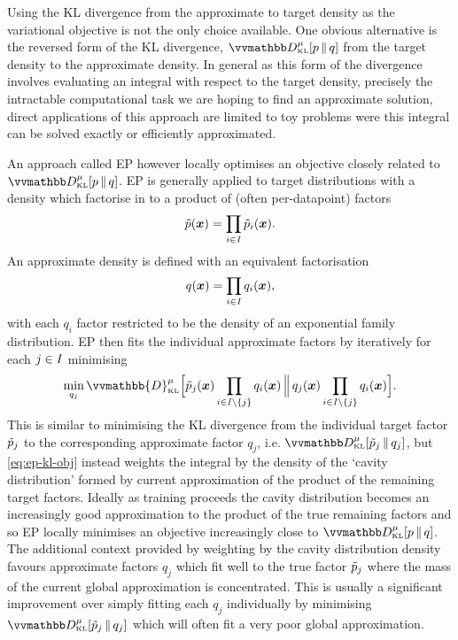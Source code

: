 Using the \ac{KL} divergence from the approximate to target density as the variational objective is not the only choice available. One obvious alternative is the reversed form of the \ac{KL} divergence, $\kldiv[\mu]{\tgtdens}{q}$ from the target density to the approximate density. In general as this form of the divergence involves evaluating an integral with respect to the target density, precisely the intractable computational task we are hoping to find an approximate solution, direct applications of this approach are limited to toy problems were this integral can be solved exactly or efficiently approximated. 

An approach called \ac{EP} \citep{minka2001expectation} however locally optimises an objective closely related to $\kldiv[\mu]{\tgtdens}{q}$. \ac{EP} is generally applied to target distributions with a density which factorise in to a product of (often per-datapoint) factors
\begin{equation}\label{eq:ep-target-density-factorisation}
  \tilde{p}(\boldsymbol{x}) = \prod_{i\in\mathit{I}} \tilde{p}_i(\boldsymbol{x}).
\end{equation}
An approximate density is defined with an equivalent factorisation
\begin{equation}\label{eq:ep-approximate-density-factorisation}
  q(\boldsymbol{x}) = \prod_{i\in\mathit{I}} q_i(\boldsymbol{x}),
\end{equation}
with each $q_i$ factor restricted to be the density of an exponential family distribution. \ac{EP} then fits the individual approximate factors by iteratively for each $j \in \mathit{I}$ minimising
\begin{equation}\label{eq:ep-kl-obj}
  \min_{q_j} \vvmathbb{D}_{\scriptscriptstyle\mathrm{KL}}^{\mu}
  \Big[
    {\utgtdens_j(\vct{x}) \prod_{i\in\set{I} \setminus \fset{j}} q_i(\vct{x})}
  \,\Big\Vert\,
    {q_j(\vct{x}) \prod_{i\in\set{I} \setminus \fset{j}} q_i(\vct{x})}
  \Big].
\end{equation}
This is similar to minimising the \ac{KL} divergence from the individual target factor $\tilde{p}_j$ to the corresponding approximate factor $q_j$, i.e. $\kldiv[\mu]{\utgtdens_j}{q_j}$, but \eqref{eq:ep-kl-obj} instead weights the integral by the density of the `cavity distribution' formed by current approximation of the product of the remaining target factors. Ideally as training proceeds the cavity distribution becomes an increasingly good approximation to the product of the true remaining factors and so \ac{EP} locally minimises an objective increasingly close to $\kldiv[\mu]{\tgtdens}{q}$. The additional context provided by weighting by the cavity distribution density favours approximate factors $q_j$ which fit well to the true factor $\tilde{p}_j$ where the mass of the current global approximation is concentrated. This is usually a significant improvement over simply fitting each $q_j$ individually by minimising $\kldiv[\mu]{\utgtdens_j}{q_j}$ which will often fit a very poor global approximation.

